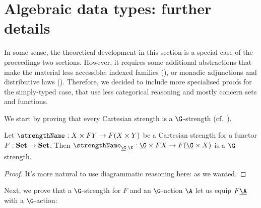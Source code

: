 \section{Algebraic data types: further details}%

In some sense, the theoretical development in this section is a
special case of the proceedings two sections. However, it requires
some additional abstractions that make the material less accessible:
indexed families (), or monadic adjunctions
and distributive laws (). Therefore, we decided to
include more specialised proofs for the simply-typed case, that use
less categorical reasoning and mostly concern sets and functions.

We start by proving that every Cartesian strength is a $\G$-strength
(cf.~).

\begin{lemma}
  Let $\strength : X \times FY \to F(X \times Y)$ be a Cartesian
  strength for a functor $F : {\mathbf{ Set}} \to {\mathbf{ Set}}$. Then
  $\strength_{\carrier\G,\X} : \carrier\G \times FX \to F(\carrier\G
  \times X)$ is a $\G$-strength.
\end{lemma}
\begin{proof}
  It's more natural to use diagrammatic reasoning here:
  as we wanted.
\end{proof}

Next, we prove that a $\G$-strength for $F$ and an $\G$-action $\A$
let us equip $F\carrier\A$ with a $\G$-action:

